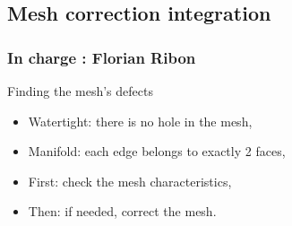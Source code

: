 \documentclass{beamer}
\begin{document}
\subsection{Mesh correction integration}

\begin{frame}
	\frametitle{In charge : Florian Ribon}
    \begin{block}{Finding the mesh's defects}
		\begin{itemize}
		    \item Watertight: there is no hole in the mesh,
            \item Manifold: each edge belongs to exactly 2 faces,
		    \item First: check the mesh characteristics,
			\item Then: if needed, correct the mesh.
		\end{itemize}
    \end{block}

\end{frame}
\end{document}
